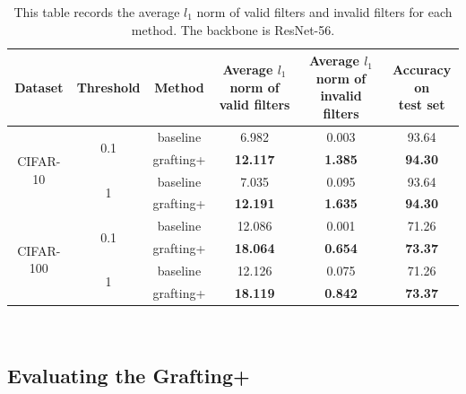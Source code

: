 \documentclass{article}
\begin{document}
\begin{table}[!t]
	\caption{This table records the average $l_{1}$ norm of valid filters and invalid filters for each method. The backbone is ResNet-56. }
	\begin{center}
		\begin{tabular}{|c|c|c|c|c|c|} 
			\hline 
			Dataset&Threshold&Method &\makecell[tc]{Average $l_{1}$ norm 
				of \\ valid filters}& \makecell[tc]{Average $l_{1}$ norm of \\invalid filters}&\makecell[tc]{Accuracy on \\test set} \\ 
			\hline
			\multirow{4}{*}{CIFAR-10}&
			\multirow{2}{*}{0.1}
			&baseline&6.982&0.003&93.64\\
			&&grafting+&\textbf{12.117}&\textbf{1.385}&\textbf{94.30}\\
			\cline{2-6}
			&\multirow{2}{*}{1}
			&baseline&7.035&0.095&93.64\\
			&&grafting+&\textbf{12.191}&\textbf{1.635}&\textbf{94.30}\\
			\hline
			\multirow{4}{*}{CIFAR-100}&
			\multirow{2}{*}{0.1}
			&baseline&12.086&0.001&71.26\\
			&&grafting+&\textbf{18.064}&\textbf{0.654}&\textbf{73.37}\\
			\cline{2-6}
			&\multirow{2}{*}{1}
			&baseline&12.126&0.075&71.26\\
			&&grafting+&\textbf{18.119}&\textbf{0.842}&\textbf{73.37}\\
			\hline
		\end{tabular}\\
	\end{center}
	\label{table:branches_2}
\end{table}




\subsection{Evaluating the Grafting+}\label{sec_4_4}
\end{document}
